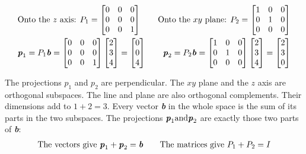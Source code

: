 \documentclass[12pt, letterpaper]{article}
\newcommand{\V}[1]{\textbf{\textit{#1}}}
\theoremstyle{definition}
\begin{document}
		\begin{gather*}
			\text{Onto the $z$ axis: }P_1 = \begin{bmatrix} 0 & 0 & 0 \\ 0 & 0 & 0 \\ 0 & 0 & 1 \end{bmatrix} \qquad \text{Onto the $xy$ plane: }P_2 = \begin{bmatrix} 1 & 0 & 0 \\ 0 & 1 & 0 \\ 0 & 0 & 0 \end{bmatrix}  \\
			\V{p}_1 = P_1\V{b} = \begin{bmatrix} 0 & 0 & 0 \\ 0 & 0 & 0 \\ 0 & 0 & 1 \end{bmatrix} \begin{bmatrix} 2\\3\\4 \end{bmatrix} = \begin{bmatrix} 0 \\ 0 \\ 4 \end{bmatrix} \qquad \V{p}_2 = P_2\V{b} = \begin{bmatrix} 1 & 0 & 0 \\ 0 & 1 & 0 \\ 0 & 0 & 0 \end{bmatrix} \begin{bmatrix} 2\\3\\4 \end{bmatrix} = \begin{bmatrix} 2 \\ 3 \\ 0 \end{bmatrix}
		\end{gather*}

	The projections $p_1$ and $p_2$ are perpendicular. The $xy$ plane and the $z$ axis are orthogonal subspaces. The line and plane are also orthogonal complements. Their dimensions add to $1+2=3$. Every vector \V{b} in the whole space is the sum of its parts in the two subspaces. The projections $\V{p}_1 \text{and} \V{p}_2$ are exactly those two parts of \V{b}:
		\begin{gather*}
			\text{The vectors give } \V{p}_1 + \V{p}_2 = \V{b} \qquad \text{The matrices give } P_1 + P_2 = I 
		\end{gather*}
	
\end{document}

